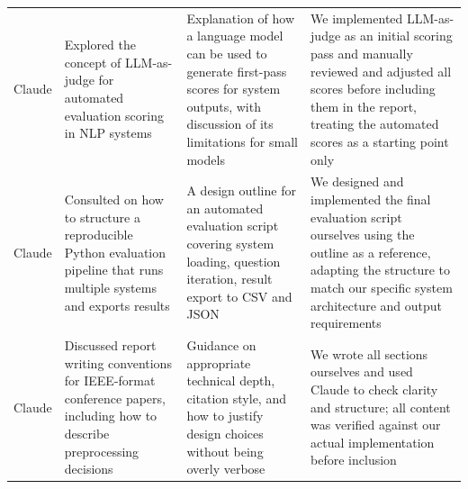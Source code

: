 \documentclass[10pt,conference]{IEEEtran}
\begin{document}
\begin{table}[p]
\begin{tabularx}{\textwidth}{p{1.5cm} p{3.5cm} p{3.5cm} X}
Claude &
Explored the concept of LLM-as-judge for automated evaluation
scoring in NLP systems &
Explanation of how a language model can be used to generate
first-pass scores for system outputs, with discussion of its
limitations for small models &
We implemented LLM-as-judge as an initial scoring pass and manually
reviewed and adjusted all scores before including them in the report,
treating the automated scores as a starting point only \\
 
Claude &
Consulted on how to structure a reproducible Python evaluation
pipeline that runs multiple systems and exports results &
A design outline for an automated evaluation script covering
system loading, question iteration, result export to CSV and JSON &
We designed and implemented the final evaluation script ourselves
using the outline as a reference, adapting the structure to match
our specific system architecture and output requirements \\
 
Claude &
Discussed report writing conventions for IEEE-format conference
papers, including how to describe preprocessing decisions &
Guidance on appropriate technical depth, citation style, and how
to justify design choices without being overly verbose &
We wrote all sections ourselves and used Claude to check clarity
and structure; all content was verified against our actual
implementation before inclusion \\
 
\bottomrule
\end{tabularx}
\end{table}
 
\end{document}
